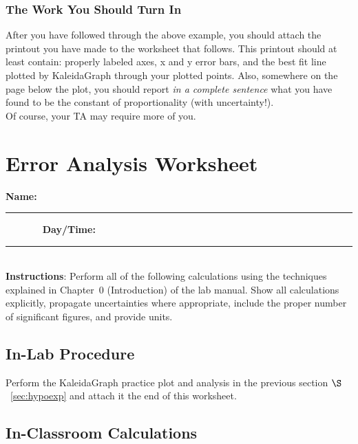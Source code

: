 \subsubsection{The Work You Should Turn In}

After you have followed through the above example, you should attach
the printout you have made to the worksheet that follows. This printout 
should at least contain:
properly labeled axes, x and y error bars, and the best fit line
plotted by KaleidaGraph through your plotted points. Also, somewhere
on the page below the plot, you should report {\it in a complete
sentence} what you have found to be the constant of proportionality
(with uncertainty!). \\

\noindent Of course, your TA may require more of you.


\vfill
\pagebreak

\renewcommand{\thesection}{\thechapter.W1}

\section{Error Analysis Worksheet}
{\bf \Large Name:}~ \rule{5cm}{.1mm}~~~~~~~
{\bf \Large Day/Time:}~\rule{3cm}{.1mm}\\

\noindent
{\bf Instructions}: Perform all of the following 
calculations using the techniques explained in 
Chapter~0 (Introduction) of the lab manual. Show all calculations explicitly, 
propagate uncertainties where appropriate, include the proper number of 
significant figures, and provide units. 

\subsection{In-Lab Procedure}

Perform the KaleidaGraph practice plot and analysis in the previous
section $\S$~\ref{sec:hypoexp} and attach it the end of this worksheet.

\subsection{In-Classroom Calculations}

